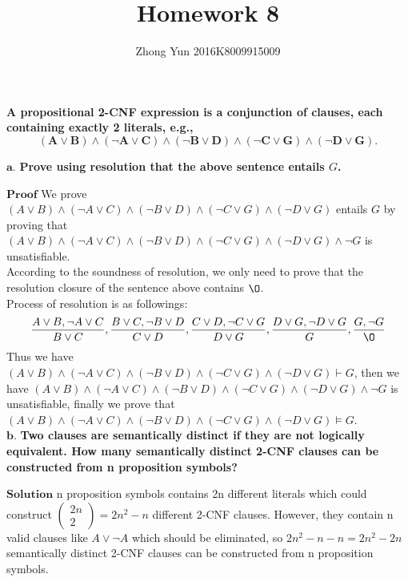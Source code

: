 \documentclass{article}
\title{Homework 8}
\author{Zhong Yun 2016K8009915009}
\begin{document}
\begin{CJK*}{GBK}{song}
\maketitle

 \textbf{A propositional 2-CNF expression is a conjunction of clauses, each containing exactly 2 literals, e.g.,}
    \[
        \mathbf{(A \lor B) \land (\lnot A \lor C) \land (\lnot B \lor D) \land (\lnot C \lor G) \land (\lnot D \lor G).}
    \]

    $\mathbf{a.}$ \textbf{Prove using resolution that the above sentence entails $G$.}

    $\textbf{Proof}$ \quad We prove $(A \lor B) \land (\lnot A \lor C) \land (\lnot B \lor D) \land (\lnot C \lor G) \land (\lnot D \lor G)$ entails $G$ by proving that $(A \lor B) \land (\lnot A \lor C) \land (\lnot B \lor D) \land (\lnot C \lor G) \land (\lnot D \lor G)\land \lnot G$ is unsatisfiable. \\\indent According to the soundness of resolution, we only need to prove that the resolution closure of the sentence above contains $\O$. \\\indent Process of resolution is as followings:
    $$\frac{A\lor B, \lnot A \lor C}{B \lor C}, \frac{B \lor C, \lnot B\lor D}{C \lor D}, \frac{C \lor D,\lnot C \lor  G}{D \lor G},\frac{D\lor G, \lnot D  \lor G}{G}, \frac{G, \lnot G}{\O}$$
    \indent Thus we have $(A \lor B) \land (\lnot A \lor C) \land (\lnot B \lor D) \land (\lnot C \lor G) \land (\lnot D \lor G)\vdash G$, then we have  $(A \lor B) \land (\lnot A \lor C) \land (\lnot B \lor D) \land (\lnot C \lor G) \land (\lnot D \lor G)\land \lnot G$ is unsatisfiable, finally we prove that  $(A \lor B) \land (\lnot A \lor C) \land (\lnot B \lor D) \land (\lnot C \lor G) \land (\lnot D \lor G)\models G$.\\

    $\mathbf{b.}$ \textbf{Two clauses are semantically distinct if they are not logically equivalent. How many semantically distinct 2-CNF clauses can be constructed from n proposition symbols?}

    $\textbf{Solution}$ \quad n proposition symbols contains 2n different literals which could construct $\begin{pmatrix} 2n \\  2 \end{pmatrix} = 2n^2-n$ different 2-CNF clauses. However, they contain n valid clauses like $A \lor \lnot A$ which should be eliminated, so $2n^2-n-n = 2n^2-2n$ semantically distinct 2-CNF clauses can be constructed from n proposition symbols.\\


\end{CJK*}
\end{document}
